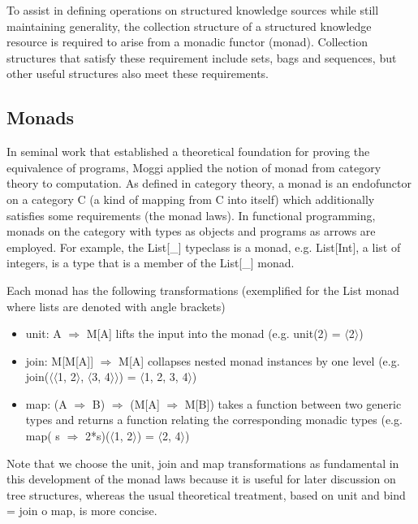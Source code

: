 \documentclass[runningheads]{llncs}
\begin{document}
To assist in defining operations on structured knowledge sources while still maintaining generality, the collection structure of a structured knowledge resource is required to arise from a monadic functor (monad). Collection structures that satisfy these requirement include sets, bags and sequences, but other useful structures also meet these requirements.

\vspace{-0.3cm}
\subsection{Monads}
In seminal work that established a theoretical foundation for proving the equivalence of programs, Moggi\cite{moggi_notions_1991} applied the notion of monad from category theory\cite{MacLane1998} to computation.
As defined in category theory, a monad  is an endofunctor on a category C (a kind of mapping from C into itself) which additionally satisfies some requirements (the monad laws).
In functional programming, monads on the category with types as objects and programs as arrows are employed.
For example, the List[\_] typeclass is a monad, e.g. List[Int], a list of integers, is a type that is a member of the List[\_] monad.

Each monad has the following transformations (exemplified for the List monad where lists are denoted with angle brackets)
\begin{itemize}
\item unit: A $\Rightarrow$ M[A] lifts the input into the monad (e.g. unit(2) = $\langle$2$\rangle$)
\item join: M[M[A]] $\Rightarrow$ M[A] collapses nested monad instances by one level (e.g. join($\langle$$\langle$1, 2$\rangle$, $\langle$3, 4$\rangle$$\rangle$) = $\langle$1, 2, 3, 4$\rangle$)
\item map: (A $\Rightarrow$ B) $\Rightarrow$ (M[A] $\Rightarrow$ M[B]) takes a function between two generic types and returns a function relating the corresponding monadic types (e.g. map( s $\Rightarrow$ 2*s)($\langle$1, 2$\rangle$) = $\langle$2, 4$\rangle$)
\end{itemize}
Note that we choose the unit, join and map transformations\cite{Wadler1992} as fundamental in this development of the monad laws because it is useful for later discussion on tree structures, whereas the usual theoretical treatment, based on unit and bind = join o map, is more concise.
\end{document}

